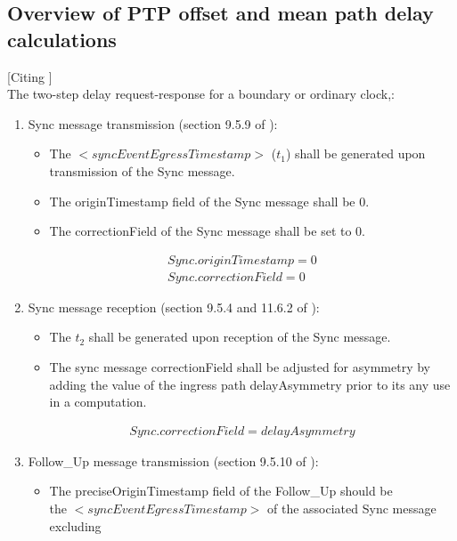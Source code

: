 \documentclass[a4paper, 12pt]{article}
\begin{document}
\subsection{Overview of PTP offset and mean path delay calculations}
\label{ap:ptpComputations}
[Citing \cite{IEEE1588}] \\
The two-step delay request-response for a boundary or ordinary clock,:
\begin{enumerate}
  \item Sync message transmission (section 9.5.9 of \cite{IEEE1588}):
    \begin{itemize}
      \item The $<syncEventEgressTimestamp>$  ($t_1$) shall be generated upon 
	    transmission of the Sync message.
      \item The originTimestamp field of the Sync message shall be 0.
      \item The correctionField of the Sync message shall be set to 0.
    \end{itemize}
	\begin{align}
	  \label{eq:Sync_tx}
	  Sync.originTimestamp = 0 \\
	  Sync.correctionField = 0
	\end{align}
  \item Sync message reception (section 9.5.4 and 11.6.2 of \cite{IEEE1588}):
    \begin{itemize}
      \item The $t_2$ shall be generated upon reception of the Sync message.
      \item The sync message correctionField shall be adjusted for asymmetry by adding the value of 
	    the ingress path delayAsymmetry prior to its any use in a computation.
    \end{itemize}
	\begin{align}
	  \label{eq:Sync_rx}
	  Sync.correctionField = delayAsymmetry
	\end{align}
  \item Follow\_Up message transmission (section 9.5.10 of \cite{IEEE1588}):
    \begin{itemize}
      \item The preciseOriginTimestamp field of the Follow\_Up should be \\
	    the $<syncEventEgressTimestamp>$ of the associated Sync message excluding 

\end{itemize}
\end{enumerate}
\end{document}
